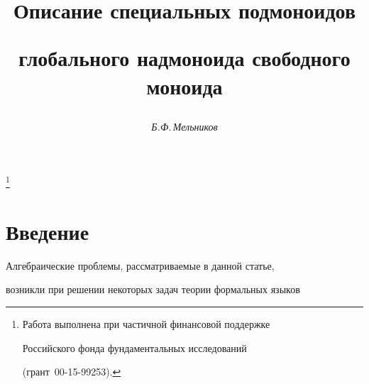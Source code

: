 

\setcounter{page}{46}















\author{\it Б.Ф.\,Мельников}




\title{Описание специальных подмоноидов


глобального надмоноида свободного моноида}


\thanks{Работа выполнена при частичной финансовой поддержке 


Российского фонда фундаментальных исследований


(грант \No\,00-15-99253).}





\date{}




\pagestyle{plain} %







\maketitle


\label{begin}














\section{Введение}





 Алгебраические проблемы, рассматриваемые в данной статье,


 возникли при решении некоторых задач теории формальных языков


